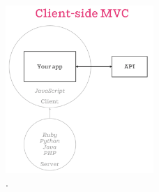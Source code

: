 
\begin{figure}[H]
	\centering
	\includegraphics[width=0.5\textwidth]{figuras/estadoArte/isomorphic-client-side-mvc.png}

	\caption{\clientSideAS \mvcAS.}
	\label{figure:client_side_mvc}
\end{figure}

















